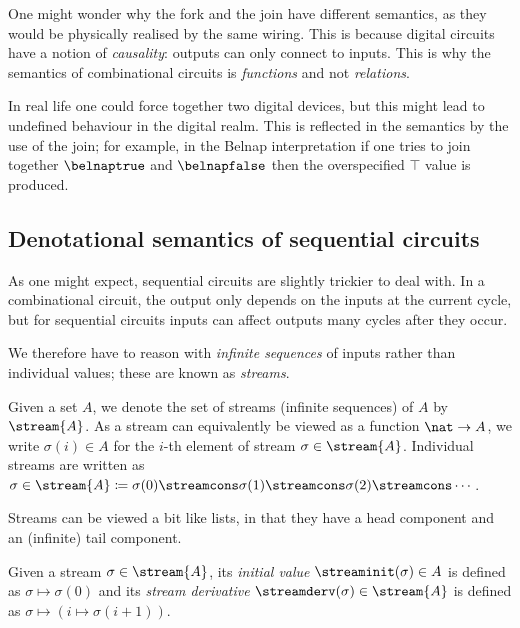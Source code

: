 \begin{remark}
    One might wonder why the fork and the join have different semantics, as they
    would be physically realised by the same wiring.
    This is because digital circuits have a notion of \emph{causality}: outputs
    can only connect to inputs.
    This is why the semantics of combinational circuits is \emph{functions} and
    not \emph{relations}.

    In real life one could force together two digital devices, but this might
    lead to undefined behaviour in the digital realm.
    This is reflected in the semantics by the use of the join; for example, in
    the Belnap interpretation if one tries to join together \(\belnaptrue\) and
    \(\belnapfalse\) then the overspecified \(\top\) value is produced.
\end{remark}

\subsection{Denotational semantics of sequential circuits}

As one might expect, sequential circuits are slightly trickier to deal with.
In a combinational circuit, the output only depends on the inputs at the current
cycle, but for sequential circuits inputs can affect outputs many cycles after
they occur.

We therefore have to reason with \emph{infinite sequences} of inputs rather than
individual values; these are known as \emph{streams}.

\begin{notation}
    Given a set \(A\), we denote the set of streams (infinite sequences) of
    \(A\) by \(\stream{A}\).
    As a stream can equivalently be viewed as a function \(\nat \to A\), we
    write \(\sigma(i) \in A\) for the \(i\)-th element of stream
    \(\sigma \in \stream{A}\).
    Individual streams are written as \(
    \sigma \in \stream{A}
    \coloneqq
    \sigma(0) \streamcons \sigma(1) \streamcons
    \sigma(2) \streamcons \cdots
    \).
\end{notation}

Streams can be viewed a bit like lists, in that they have a head component and
an (infinite) tail component.

\begin{definition}\label{def:stream-operations}
    Given a stream \(\sigma \in \stream{A}\), its \emph{initial value}
    \(\streaminit(\sigma) \in A\) is defined as \(\sigma \mapsto \sigma(0)\)
    and its \emph{stream derivative} \(\streamderv(\sigma) \in \stream{A}\) is
    defined as \(\sigma \mapsto (i \mapsto \sigma(i+1))\).
\end{definition}

